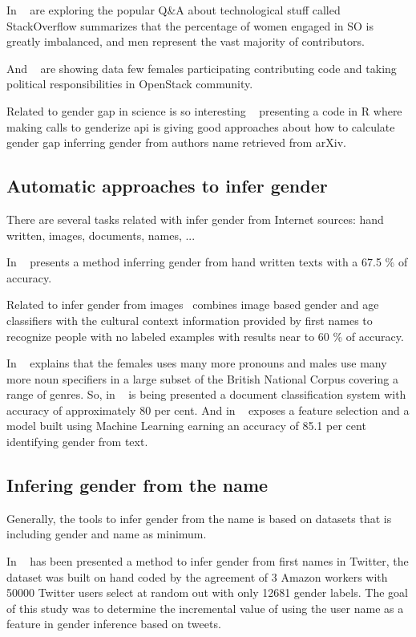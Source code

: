 \documentclass[a4paper]{article}
\begin{document}
In ~\cite{vasilescu2012gender} are exploring the popular Q\&A about
technological stuff called StackOverflow summarizes that the
percentage of women engaged in SO is greatly imbalanced, and men
represent the vast majority of contributors.

And ~\cite{izquierdo2018openstack} are showing data few females
participating contributing code and taking political responsibilities
in OpenStack community.

Related to gender gap in science is so interesting
~\cite{holman2018gender} presenting a code in R where making calls to
genderize api is giving good approaches about how to calculate gender
gap inferring gender from authors name retrieved from arXiv.

\subsection{Automatic approaches to infer gender}

There are several tasks related with infer gender from Internet
sources: hand written, images, documents, names, ...

In ~\cite{liwicki2011automatic} presents a method inferring gender from
hand written texts with a 67.5 \% of accuracy.

Related to infer gender from images~\cite{gallagher2008estimating}
combines image based gender and age classifiers with the cultural
context information provided by first names to recognize people with
no labeled examples with results near to 60 \% of accuracy.

In ~\cite{argamon2003gender} explains that the females uses many more
pronouns and males use many more noun specifiers in a large subset of
the British National Corpus covering a range of genres. So, in
~\cite{koppel2002automatically} is being presented a document
classification system with accuracy of approximately 80 per cent. And
in ~\cite{cheng2011author} exposes a feature selection and a model
built using Machine Learning earning an accuracy of 85.1 per cent
identifying gender from text.

\subsection{Infering gender from the name}

Generally, the tools to infer gender from the name is based on
datasets that is including gender and name as minimum.

In ~\cite{liu2013s} has been presented a method to infer gender from
first names in Twitter, the dataset was built on hand coded by the
agreement of 3 Amazon workers with 50000 Twitter users select at
random out with only 12681 gender labels. The goal of this study was
to determine the incremental value of using the user name as a feature
in gender inference based on tweets.
\end{document}
